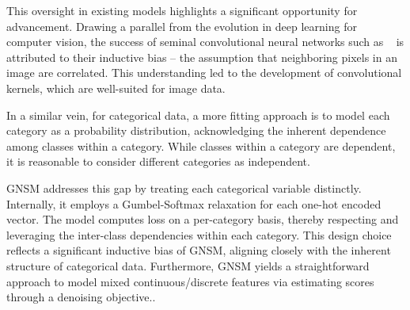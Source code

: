 This oversight in existing models highlights a significant opportunity for advancement. Drawing a parallel from the evolution in deep learning for computer vision, the success of seminal convolutional neural networks such as ~\cite{alexnet,vgg} is attributed to their inductive bias – the assumption that neighboring pixels in an image are correlated. This understanding led to the development of convolutional kernels, which are well-suited for image data.

In a similar vein, for categorical data, a more fitting approach is to model each category as a probability distribution, acknowledging the inherent dependence among classes within a category. While classes within a category are dependent, it is reasonable to consider different categories as independent.

GNSM addresses this gap by treating each categorical variable distinctly. Internally, it employs a Gumbel-Softmax relaxation for each one-hot encoded vector. The model computes loss on a per-category basis, thereby respecting and leveraging the inter-class dependencies within each category. This design choice reflects a significant inductive bias of GNSM, aligning closely with the inherent structure of categorical data.  Furthermore, GNSM yields a straightforward approach to model mixed continuous/discrete features via estimating scores through a denoising objective..




